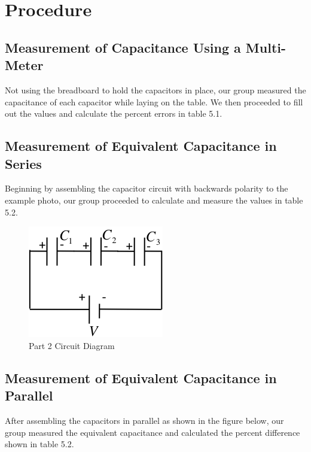 \documentclass[titlepage]{article}
\begin{document}
    



	\section{Procedure}

        \subsection{Measurement of Capacitance Using a Multi-Meter}
        Not using the breadboard to hold the capacitors in place, our group measured the capacitance of each capacitor while laying on the table. We then proceeded to fill out the values and calculate the percent errors in table 5.1.

        \subsection{Measurement of Equivalent Capacitance in Series}
        Beginning by assembling the capacitor circuit with backwards polarity to the example photo, our group proceeded to calculate and measure the values in table 5.2.\\ 

        \begin{figure}[hbt!] 
            \centering
            \caption*{Part 2 Circuit Diagram}
            \includegraphics{images/procedure/part2.png}
        \end{figure} 

        \subsection{Measurement of Equivalent Capacitance in Parallel}
        After assembling the capacitors in parallel as shown in the figure below, our group measured the equivalent capacitance and calculated the percent difference shown in table 5.2.
\end{document}
